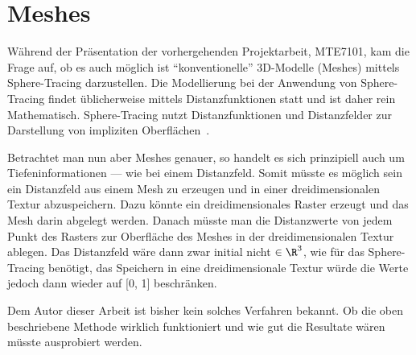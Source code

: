 \section{Meshes}
\label{sec:rendering:meshes}

Während der Präsentation der vorhergehenden Projektarbeit, MTE7101, kam die
Frage auf, ob es auch möglich ist ``konventionelle'' 3D-Modelle (Meshes) mittels
Sphere-Tracing darzustellen. Die Modellierung bei der Anwendung von Sphere-Tracing findet 
üblicherweise mittels Distanzfunktionen statt und ist daher rein Mathematisch.
Sphere-Tracing nutzt Distanzfunktionen und Distanzfelder zur Darstellung von
impliziten Oberflächen~\cite[S. 31]{osterwalder_sven_volume_2016}.

Betrachtet man nun aber Meshes genauer, so handelt es sich prinzipiell auch um
Tiefeninformationen --- wie bei einem Distanzfeld. Somit müsste es möglich sein
ein Distanzfeld aus einem Mesh zu erzeugen und in einer dreidimensionalen
Textur abzuspeichern. Dazu könnte ein dreidimensionales Raster erzeugt und das
Mesh darin abgelegt werden. Danach müsste man die Distanzwerte von jedem Punkt
des Rasters zur Oberfläche des Meshes in der dreidimensionalen Textur ablegen.
Das Distanzfeld wäre dann zwar initial nicht $\in \R^{3}$, wie für das
Sphere-Tracing benötigt, das Speichern in eine dreidimensionale Textur würde
die Werte jedoch dann wieder auf [0, 1] beschränken.

Dem Autor dieser Arbeit ist bisher kein solches Verfahren bekannt. Ob die oben
beschriebene Methode wirklich funktioniert und wie gut die Resultate wären
müsste ausprobiert werden.
